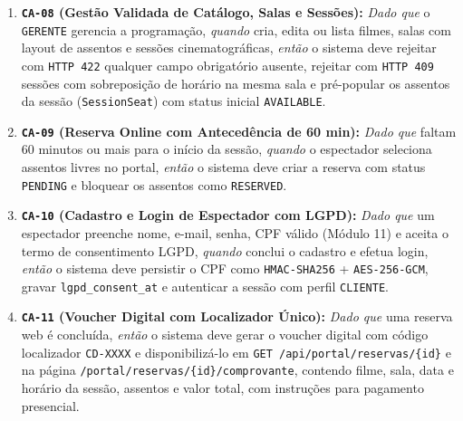 \begin{enumerate}
\item \textbf{\texttt{CA-08} (Gestão Validada de Catálogo, Salas e Sessões):} \emph{Dado que} o \texttt{GERENTE} gerencia a programação, \emph{quando} cria, edita ou lista filmes, salas com layout de assentos e sessões cinematográficas, \emph{então} o sistema deve rejeitar com \texttt{HTTP 422} qualquer campo obrigatório ausente, rejeitar com \texttt{HTTP 409} sessões com sobreposição de horário na mesma sala e pré-popular os assentos da sessão (\texttt{SessionSeat}) com status inicial \texttt{AVAILABLE}.
\item \textbf{\texttt{CA-09} (Reserva Online com Antecedência de 60 min):} \emph{Dado que} faltam 60 minutos ou mais para o início da sessão, \emph{quando} o espectador seleciona assentos livres no portal, \emph{então} o sistema deve criar a reserva com status \texttt{PENDING} e bloquear os assentos como \texttt{RESERVED}.
\item \textbf{\texttt{CA-10} (Cadastro e Login de Espectador com LGPD):} \emph{Dado que} um espectador preenche nome, e-mail, senha, CPF válido (Módulo 11) e aceita o termo de consentimento LGPD, \emph{quando} conclui o cadastro e efetua login, \emph{então} o sistema deve persistir o CPF como \texttt{HMAC-\allowbreak\hspace{0pt plus 1pt}SHA256} + \texttt{AES-\allowbreak\hspace{0pt plus 1pt}256-\allowbreak\hspace{0pt plus 1pt}GCM}, gravar \texttt{lgpd\_\allowbreak\hspace{0pt plus 1pt}consent\_\allowbreak\hspace{0pt plus 1pt}at} e autenticar a sessão com perfil \texttt{CLIENTE}.
\item \textbf{\texttt{CA-11} (Voucher Digital com Localizador Único):} \emph{Dado que} uma reserva web é concluída, \emph{então} o sistema deve gerar o voucher digital com código localizador \texttt{CD-XXXX} e disponibilizá-lo em \texttt{GET \allowbreak\hspace{0pt plus 1pt}/\allowbreak\hspace{0pt plus 1pt}api/\allowbreak\hspace{0pt plus 1pt}portal/\allowbreak\hspace{0pt plus 1pt}reservas/\allowbreak\hspace{0pt plus 1pt}\{id\}} e na página \texttt{/\allowbreak\hspace{0pt plus 1pt}portal/\allowbreak\hspace{0pt plus 1pt}reservas/\allowbreak\hspace{0pt plus 1pt}\{id\}/\allowbreak\hspace{0pt plus 1pt}comprovante}, contendo filme, sala, data e horário da sessão, assentos e valor total, com instruções para pagamento presencial.

\end{enumerate}
